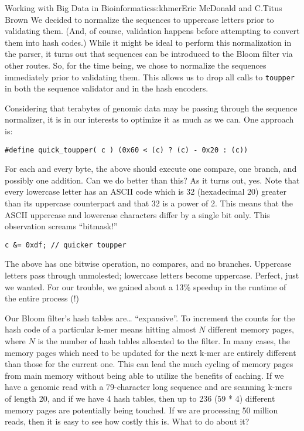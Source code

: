 \begin{aosachapter}{Working with Big Data in Bioinformatics}{s:khmer}{Eric McDonald and C.\/Titus Brown}
We decided to normalize the sequences to uppercase letters prior to
validating them. (And, of course, validation happens before attempting
to convert them into hash codes.) While it might be ideal to perform
this normalization in the parser, it turns out that sequences can be
introduced to the Bloom filter via other routes. So, for the time being,
we chose to normalize the sequences immediately prior to validating
them. This allows us to drop all calls to \texttt{toupper} in both the
sequence validator and in the hash encoders.

Considering that terabytes of genomic data may be passing through the
sequence normalizer, it is in our interests to optimize it as much as we
can. One approach is:

\begin{verbatim}
#define quick_toupper( c ) (0x60 < (c) ? (c) - 0x20 : (c))
\end{verbatim}

\noindent For each and every byte, the above should execute one compare, one
branch, and possibly one addition. Can we do better than this? As it
turns out, yes. Note that every lowercase letter has an ASCII code which
is 32 (hexadecimal 20) greater than its uppercase counterpart and that
32 is a power of 2. This means that the ASCII uppercase and lowercase
characters differ by a single bit only. This observation screams
``bitmask!''

\begin{verbatim}
c &= 0xdf; // quicker toupper
\end{verbatim}

\noindent The above has one bitwise operation, no compares, and no branches.
Uppercase letters pass through unmolested; lowercase letters become
uppercase. Perfect, just we wanted. For our trouble, we gained about a
13\% speedup in the runtime of the entire process (!)

Our Bloom filter's hash tables are\ldots{} ``expansive''. To increment
the counts for the hash code of a particular k-mer means hitting almost
$N$ different memory pages, where $N$ is the number of hash tables
allocated to the filter. In many cases, the memory pages which need to
be updated for the next k-mer are entirely different than those for the
current one. This can lead the much cycling of memory pages from main
memory without being able to utilize the benefits of caching. If we have
a genomic read with a 79-character long sequence and are scanning k-mers
of length 20, and if we have 4 hash tables, then up to 236 (59 * 4)
different memory pages are potentially being touched. If we are
processing 50 million reads, then it is easy to see how costly this is.
What to do about it?


\end{aosachapter}
